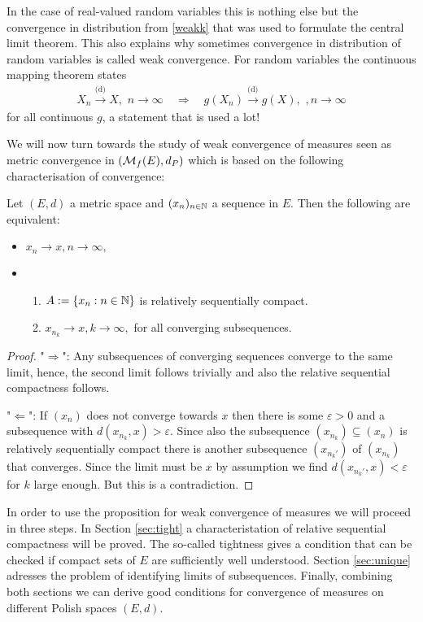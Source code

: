 In the case of real-valued random variables this is nothing else but the convergence in distribution from \eqref{weakk} that was used to formulate the central limit theorem. This also explains why sometimes convergence in distribution of random variables is called weak convergence. For random variables the continuous mapping theorem states
\begin{align*}
	X_n\overset{\text{(d)}}{\longrightarrow} X,\,\,n\to\infty\quad \Longrightarrow\quad g(X_n)\overset{\text{(d)}}{\longrightarrow} g(X),\,\,,n\to\infty
\end{align*}
for all continuous $g$, a statement that is used a lot!\smallskip

We will now turn towards the study of weak convergence of measures seen as metric convergence in $(\mathcal{M}_f(E),d_P)$ which is based on the following characterisation of convergence:
\begin{lAussageWerkzeug}
\begin{prop}\label{propkonvergenz}
	Let $(E,d)$ a metric space and $(x_n)_{n\in\mathbb{N}}$ a sequence in $E$. Then the following are equivalent:
	\begin{itemize}
		\item $x_n\to x, n\to\infty,$
		\item 
		\begin{enumerate}[label=(\roman*)]
			\item $A:=\{x_n:n\in\mathbb{N}\}$ is relatively sequentially compact.
			\item $x_{n_k}\to x,k\to\infty,$ for all converging subsequences.
		\end{enumerate}
	\end{itemize}
\end{prop}
\end{lAussageWerkzeug}
\begin{proof}[Proof]
	"$\Rightarrow$": Any subsequences of converging sequences converge to the same limit, hence, the second limit follows trivially and also the relative sequential compactness follows.\smallskip
	
	"$\Leftarrow$": If $(x_n)$ does not converge towards $x$ then there is some $\varepsilon>0$ and a subsequence with $d(x_{n_k},x)>\varepsilon$. Since also the subsequence $(x_{n_k})\subseteq (x_n)$ is relatively sequentially compact there is another subsequence $(x_{n_k'})$ of $(x_{n_k})$ that converges. Since the limit must be $x$ by assumption we find $d(x_{n_k'},x)<\varepsilon$ for $k$ large enough. But this is a contradiction.
\end{proof}
In order to use the proposition for weak convergence of measures we will proceed in three steps. In Section \ref{sec:tight} a characteristation of relative sequential compactness will be proved. The so-called tightness gives a condition that can be checked if compact sets of $E$ are sufficiently well understood. Section \ref{sec:unique} adresses the problem of identifying limits of subsequences. Finally, combining both sections we can derive good conditions for convergence of measures on different Polish spaces $(E,d)$. 



